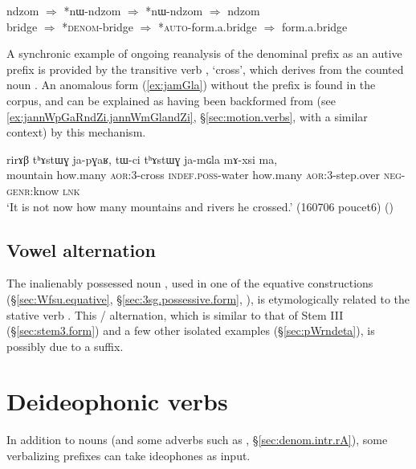 \begin{exe}
\ex \label{ex:nW.backformation}
\gll   ndzom $\Rightarrow$ *nɯ-ndzom $\Rightarrow$ *nɯ-ndzom $\Rightarrow$ ndzom \\
bridge $\Rightarrow$ *\textsc{denom}-bridge  $\Rightarrow$ *\textsc{auto}-form.a.bridge $\Rightarrow$  form.a.bridge \\
\end{exe}

A synchronic example of ongoing reanalysis of the  denominal prefix as an autive prefix is provided by the transitive verb , `cross', which derives from the counted noun . An anomalous form  (\ref{ex:jamGla}) without the  prefix is found in the corpus, and can be explained as having been backformed from  (see \ref{ex:jannWpGaRndZi.jannWmGlandZi}, §\ref{sec:motion.verbs}, with a similar context) by this mechanism.
 
\begin{exe}
\ex \label{ex:jamGla}
\gll rirɤβ tʰɤstɯɣ ja-pɣaʁ, tɯ-ci tʰɤstɯɣ ja-mɢla mɤ-xsi ma, \\
mountain how.many \textsc{aor}:3\flobv{}-cross \textsc{indef}.\textsc{poss}-water how.many \textsc{aor}:3\flobv{}-step.over \textsc{neg}-\textsc{genr}:know \textsc{lnk} \\
\glt `It is not now how many mountains and rivers he crossed.' (160706 poucet6)
()
\end{exe}


\subsection{Vowel alternation}  \label{sec:fsu.fse}
The inalienably possessed noun , used in one of the equative constructions (§\ref{sec:Wfsu.equative}, §\ref{sec:3sg.possessive.form}, \citealt{jacques18similative}), is etymologically related to the stative verb . This  /  alternation, which is similar to that of Stem III (§\ref{sec:stem3.form}) and a few other isolated examples (§\ref{sec:pWrndeta}), is possibly due to a  suffix.

 
\section{Deideophonic verbs}  \label{sec:voice.deideophonic}
In addition to nouns (and some adverbs such as  , §\ref{sec:denom.intr.rA}), some verbalizing prefixes can take ideophones as input. 


